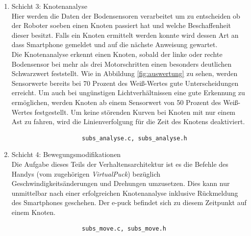 \documentclass[10pt,a4paper]{article}
\begin{document}
\begin{enumerate}
				\item Schicht 3: Knotenanalyse \\
					Hier werden die Daten der Bodensensoren verarbeitet um zu entscheiden ob der Roboter soeben einen Knoten passiert hat und welche
					Beschaffenheit dieser besitzt. Falls ein Knoten ermittelt werden konnte wird dessen Art an dass Smartphone gemeldet und auf
					die nächste Anweisung gewartet.	\\
					Die Knotenanalyse erkennt einen Knoten, sobald der linke oder rechte Bodensensor bei mehr als drei Motorschritten einen besonders
					deutlichen Schwarzwert feststellt. Wie in Abbildung \ref{fig:auswertung} zu sehen, werden Sensorwerte bereits bei 70 Prozent des
					Weiß-Wertes gute Unterscheidungen erreicht. Um auch bei ungünstigen Lichtverhältnissen eine gute Erkennung zu ermöglichen,
					werden Knoten ab einem Sensorwert von 50 Prozent des Weiß-Wertes festgestellt. Um keine störenden Kurven bei Knoten mit nur einem
					Ast zu fahren, wird die Linienverfolgung für die Zeit des Knotens deaktiviert. 				

					\begin{verbatim}  
					subs_analyse.c, subs_analyse.h
					\end{verbatim}

				\item Schicht 4: Bewegungsmodifikationen \\
					Die Aufgabe dieses Teils der Verhaltensarchitektur ist es die Befehle des Handys (vom zugehörigen \textit{VirtualPuck}) bezüglich
					Geschwindigkeitsänderungen und Drehungen	 umzusetzen. Dies kann nur unmittelbar nach einer erfolgreichen Knotenanalyse
					inklusive Rückmeldung des Smartphones geschehen. Der e-puck befindet sich zu diesem Zeitpunkt auf einem Knoten.			

					\begin{verbatim}  
					subs_move.c, subs_move.h
					\end{verbatim}


\end{enumerate}
\end{document}
